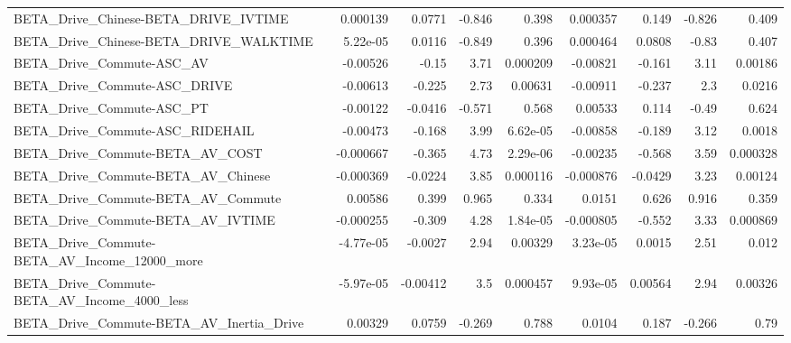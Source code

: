 \begin{tabular}{lrrrrrrrr}
BETA\_Drive\_Chinese-BETA\_DRIVE\_IVTIME               &    0.000139 &       0.0771 &   -0.846 &    0.398 &   0.000357 &       0.149 &       -0.826 &         0.409 \\
BETA\_Drive\_Chinese-BETA\_DRIVE\_WALKTIME             &    5.22e-05 &       0.0116 &   -0.849 &    0.396 &   0.000464 &      0.0808 &        -0.83 &         0.407 \\
BETA\_Drive\_Commute-ASC\_AV                          &    -0.00526 &        -0.15 &     3.71 & 0.000209 &   -0.00821 &      -0.161 &         3.11 &       0.00186 \\
BETA\_Drive\_Commute-ASC\_DRIVE                       &    -0.00613 &       -0.225 &     2.73 &  0.00631 &   -0.00911 &      -0.237 &          2.3 &        0.0216 \\
BETA\_Drive\_Commute-ASC\_PT                          &    -0.00122 &      -0.0416 &   -0.571 &    0.568 &    0.00533 &       0.114 &        -0.49 &         0.624 \\
BETA\_Drive\_Commute-ASC\_RIDEHAIL                    &    -0.00473 &       -0.168 &     3.99 & 6.62e-05 &   -0.00858 &      -0.189 &         3.12 &        0.0018 \\
BETA\_Drive\_Commute-BETA\_AV\_COST                    &   -0.000667 &       -0.365 &     4.73 & 2.29e-06 &   -0.00235 &      -0.568 &         3.59 &      0.000328 \\
BETA\_Drive\_Commute-BETA\_AV\_Chinese                 &   -0.000369 &      -0.0224 &     3.85 & 0.000116 &  -0.000876 &     -0.0429 &         3.23 &       0.00124 \\
BETA\_Drive\_Commute-BETA\_AV\_Commute                 &     0.00586 &        0.399 &    0.965 &    0.334 &     0.0151 &       0.626 &        0.916 &         0.359 \\
BETA\_Drive\_Commute-BETA\_AV\_IVTIME                  &   -0.000255 &       -0.309 &     4.28 & 1.84e-05 &  -0.000805 &      -0.552 &         3.33 &      0.000869 \\
BETA\_Drive\_Commute-BETA\_AV\_Income\_12000\_more       &   -4.77e-05 &      -0.0027 &     2.94 &  0.00329 &   3.23e-05 &      0.0015 &         2.51 &         0.012 \\
BETA\_Drive\_Commute-BETA\_AV\_Income\_4000\_less        &   -5.97e-05 &     -0.00412 &      3.5 & 0.000457 &   9.93e-05 &     0.00564 &         2.94 &       0.00326 \\
BETA\_Drive\_Commute-BETA\_AV\_Inertia\_Drive           &     0.00329 &       0.0759 &   -0.269 &    0.788 &     0.0104 &       0.187 &       -0.266 &          0.79 \\

\end{tabular}
